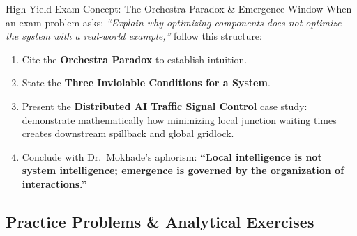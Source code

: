 \begin{examprepbox}{High-Yield Exam Concept: The Orchestra Paradox \& Emergence Window}
When an exam problem asks: \textit{``Explain why optimizing components does not optimize the system with a real-world example,''} follow this structure:
\begin{enumerate}[leftmargin=1.5em]
    \item Cite the \textbf{Orchestra Paradox} to establish intuition.
    \item State the \textbf{Three Inviolable Conditions for a System}.
    \item Present the \textbf{Distributed AI Traffic Signal Control} case study: demonstrate mathematically how minimizing local junction waiting times creates downstream spillback and global gridlock.
    \item Conclude with Dr.~Mokhade's aphorism: \textbf{``Local intelligence is not system intelligence; emergence is governed by the organization of interactions.''}
\end{enumerate}
\end{examprepbox}

\subsection{Practice Problems \& Analytical Exercises}

